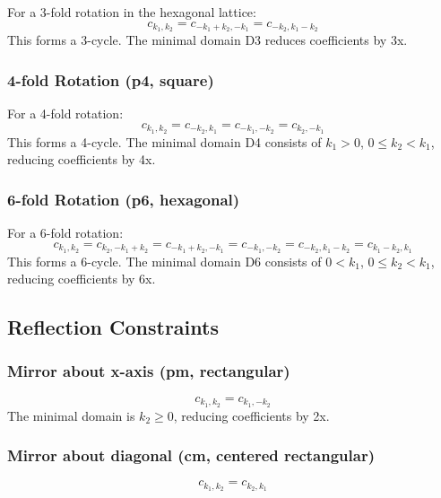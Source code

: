 For a 3-fold rotation in the hexagonal lattice:
\begin{equation}
    c_{k_1,k_2} = c_{-k_1+k_2,-k_1} = c_{-k_2,k_1-k_2}
\end{equation}
This forms a 3-cycle. The minimal domain D3 reduces coefficients by 3x.

\subsubsection{4-fold Rotation (p4, square)}

For a 4-fold rotation:
\begin{equation}
    c_{k_1,k_2} = c_{-k_2,k_1} = c_{-k_1,-k_2} = c_{k_2,-k_1}
\end{equation}
This forms a 4-cycle. The minimal domain D4 consists of $k_1 > 0$, $0 \leq k_2 < k_1$, reducing coefficients by 4x.

\subsubsection{6-fold Rotation (p6, hexagonal)}

For a 6-fold rotation:
\begin{equation}
    c_{k_1,k_2} = c_{k_2,-k_1+k_2} = c_{-k_1+k_2,-k_1} = c_{-k_1,-k_2} = c_{-k_2,k_1-k_2} = c_{k_1-k_2,k_1}
\end{equation}
This forms a 6-cycle. The minimal domain D6 consists of $0 < k_1$, $0 \leq k_2 < k_1$, reducing coefficients by 6x.

\subsection{Reflection Constraints}

\subsubsection{Mirror about x-axis (pm, rectangular)}

\begin{equation}
    c_{k_1,k_2} = c_{k_1,-k_2}
\end{equation}
The minimal domain is $k_2 \geq 0$, reducing coefficients by 2x.

\subsubsection{Mirror about diagonal (cm, centered rectangular)}

\begin{equation}
    c_{k_1,k_2} = c_{k_2,k_1}
\end{equation}

